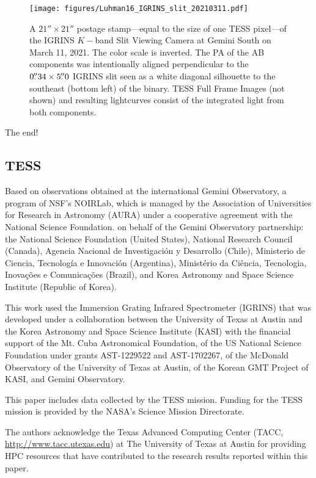 \documentclass[modern]{aastex631}
\begin{document}
\begin{figure*}[ht]
  \centering
    \texttt{[image: figures/Luhman16\_IGRINS\_slit\_20210311.pdf]} \\
\caption{A $21'' \times 21''$ postage stamp---equal to the size of one TESS pixel---of the IGRINS $K-$band Slit Viewing Camera at Gemini South on March 11, 2021.  The color scale is inverted.  The PA of the AB components was intentionally aligned perpendicular to the $0\mbox{$.\!\!^{\prime\prime}$}34 \times 5\mbox{$.\!\!^{\prime\prime}$}0$ IGRINS slit seen as a white diagonal silhouette to the southeast (bottom left) of the binary. TESS Full Frame Images (not shown) and resulting lightcurves consist of the integrated light from both components.}
\label{fig:imaging}
\end{figure*}

The end!


\subsection{TESS}


\begin{acknowledgements}
Based on observations obtained at the international Gemini Observatory, a program of NSF’s NOIRLab, which is managed by the Association of Universities for Research in Astronomy (AURA) under a cooperative agreement with the National Science Foundation. on behalf of the Gemini Observatory partnership: the National Science Foundation (United States), National Research Council (Canada), Agencia Nacional de Investigaci\'{o}n y Desarrollo (Chile), Ministerio de Ciencia, Tecnolog\'{i}a e Innovaci\'{o}n (Argentina), Minist\'{e}rio da Ci\^{e}ncia, Tecnologia, Inova\c{c}\~{o}es e Comunica\c{c}\~{o}es (Brazil), and Korea Astronomy and Space Science Institute (Republic of Korea).

This work used the Immersion Grating Infrared Spectrometer (IGRINS) that was developed under a collaboration between the University of Texas at Austin and the Korea Astronomy and Space Science Institute (KASI) with the financial support of the Mt. Cuba Astronomical Foundation, of the US National Science Foundation under grants AST-1229522 and AST-1702267, of the McDonald Observatory of the University of Texas at Austin, of the Korean GMT Project of KASI, and Gemini Observatory.

This paper includes data collected by the TESS mission. Funding for the TESS mission is provided by the NASA's Science Mission Directorate.

The authors acknowledge the Texas Advanced Computing Center (TACC, \url{http://www.tacc.utexas.edu}) at The University of Texas at Austin for providing HPC resources that have contributed to the research results reported within this paper.
\end{acknowledgements}
\end{document}
